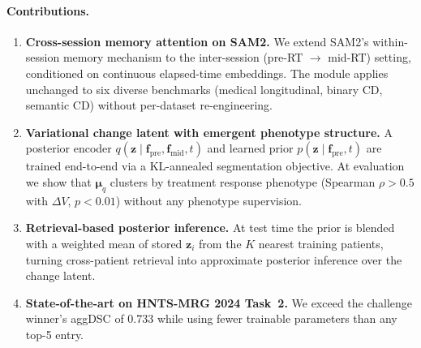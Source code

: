 \paragraph{Contributions.}
\begin{enumerate}
\item \textbf{Cross-session memory attention on SAM2.}  We extend
  SAM2's within-session memory mechanism to the inter-session
  (pre-RT $\to$ mid-RT) setting, conditioned on continuous elapsed-time
  embeddings.  The module applies unchanged to six diverse benchmarks
  (medical longitudinal, binary CD, semantic CD) without per-dataset
  re-engineering.

\item \textbf{Variational change latent with emergent phenotype structure.}
  A posterior encoder $q(\mathbf{z}\mid\mathbf{f}_{\text{pre}},
  \mathbf{f}_{\text{mid}}, t)$ and learned prior $p(\mathbf{z}\mid
  \mathbf{f}_{\text{pre}}, t)$ are trained end-to-end via a KL-annealed
  segmentation objective.  At evaluation we show that $\boldsymbol{\mu}_q$
  clusters by treatment response phenotype (Spearman $\rho > 0.5$ with
  $\Delta V$, $p < 0.01$) without any phenotype supervision.

\item \textbf{Retrieval-based posterior inference.}  At test time the
  prior is blended with a weighted mean of stored $\mathbf{z}_i$ from
  the $K$ nearest training patients, turning cross-patient retrieval into
  approximate posterior inference over the change latent.

\item \textbf{State-of-the-art on HNTS-MRG 2024 Task~2.}  We exceed the
  challenge winner's aggDSC of 0.733 while using fewer trainable parameters
  than any top-5 entry.
\end{enumerate}
